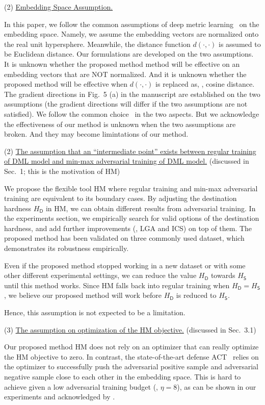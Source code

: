 (2) \ul{Embedding Space Assumption.}

In this paper, we follow the common assumptions of deep metric
learning~\cite{revisiting} on the embedding space.
%
Namely, we assume the embedding vectors are normalized onto the real unit
hypersphere.
%
Meanwhile, the distance function $d(\cdot,\cdot)$ is assumed to be Euclidean
distance.
%
Our formulations are developed on the two assumptions.
%
It is unknown whether the proposed method method will be effective on an
embedding vectors that are NOT normalized.
%
And it is unknown whether the proposed method will be effective when
$d(\cdot,\cdot)$ is replaced as, \eg, cosine distance.
%
The gradient directions in Fig.~5 (a) in the manuscript are established on the
two assumptions (the gradient directions will differ if the two assumptions are
not satisfied).
%
We follow the common choice~\cite{revisiting,robrank} in the two aspects.
%
But we acknowledge the effectiveness of our method is unknown when the
two assumptions are broken.
%
And they may become limintations of our method.

(2) \ul{The assumption that an ``intermediate point'' exists between regular
training of DML model and min-max adversarial training of DML model.}
(discussed in Sec.~1; this is the motivation of HM)

We propose the flexible tool HM where regular training and min-max adversarial
training are equivalent to its boundary cases.
%
By adjusting the destination hardness $H_\mathsf{D}$ in HM, we can obtain
different results from adversarial training.
%
In the experiments section, we empirically search for valid options of the
destination hardness, and add further improvements (\ie, LGA and ICS) on top of
them.
%
The proposed method has been validated on three commonly used dataset, which
demonstrates its robustness empirically.

Even if the proposed method stopped working in a new dataset or with some other
different experimental settings, we can reduce
the value $H_\mathsf{D}$ towards $H_\mathsf{S}$ until this method works.
%
Since HM falls back into regular training when $H_\mathsf{D}=H_\mathsf{S}$,
we believe our proposed method will work before $H_\mathsf{D}$ is reduced
to $H_\mathsf{S}$.

Hence, this assumption is not expected to be a limitation.

(3) \ul{The assumption on optimization of the HM objective.}
(discussed in Sec.~3.1)

Our proposed method HM does not rely on an optimizer that can really optimize
the HM objective to zero.
%
In contrast, the state-of-the-art defense ACT~\cite{robrank} relies on the
optimizer to successfully push the adversarial positive sample and adversarial
negative sample close to each other in the embedding space.
%
This is hard to achieve given a low adversarial training budget (\eg, $\eta=8$),
as can be shown in our experiments and acknowledged by \cite{robrank}.

